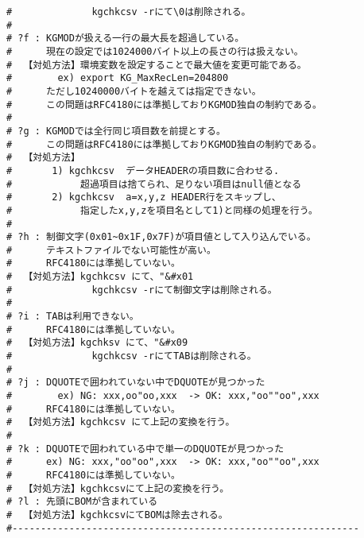 \begin{Verbatim}[baselinestretch=0.7,frame=single]
#              kgchkcsv -rにて\0は削除される。
#
# ?f : KGMODが扱える一行の最大長を超過している。
#      現在の設定では1024000バイト以上の長さの行は扱えない。
#  【対処方法】環境変数を設定することで最大値を変更可能である。
#        ex) export KG_MaxRecLen=204800
#      ただし10240000バイトを越えては指定できない。 
#      この問題はRFC4180には準拠しておりKGMOD独自の制約である。
#
# ?g : KGMODでは全行同じ項目数を前提とする。
#      この問題はRFC4180には準拠しておりKGMOD独自の制約である。
#  【対処方法】
#       1) kgchkcsv  データHEADERの項目数に合わせる.
#            超過項目は捨てられ、足りない項目はnull値となる
#       2) kgchkcsv  a=x,y,z HEADER行をスキップし、
#            指定したx,y,zを項目名として1)と同様の処理を行う。
#
# ?h : 制御文字(0x01~0x1F,0x7F)が項目値として入り込んでいる。
#      テキストファイルでない可能性が高い。
#      RFC4180には準拠していない。
#  【対処方法】kgchkcsv にて、"&#x01
#              kgchkcsv -rにて制御文字は削除される。
#
# ?i : TABは利用できない。
#      RFC4180には準拠していない。
#  【対処方法】kgchksv にて、"&#x09
#              kgchkcsv -rにてTABは削除される。
#
# ?j : DQUOTEで囲われていない中でDQUOTEが見つかった
#        ex) NG: xxx,oo"oo,xxx  -> OK: xxx,"oo""oo",xxx
#      RFC4180には準拠していない。
#  【対処方法】kgchkcsv にて上記の変換を行う。
#
# ?k : DQUOTEで囲われている中で単一のDQUOTEが見つかった
#      ex) NG: xxx,"oo"oo",xxx  -> OK: xxx,"oo""oo",xxx
#      RFC4180には準拠していない。
#  【対処方法】kgchkcsvにて上記の変換を行う。
# ?l : 先頭にBOMが含まれている
#  【対処方法】kgchkcsvにてBOMは除去される。
#-------------------------------------------------------------
\end{Verbatim}
